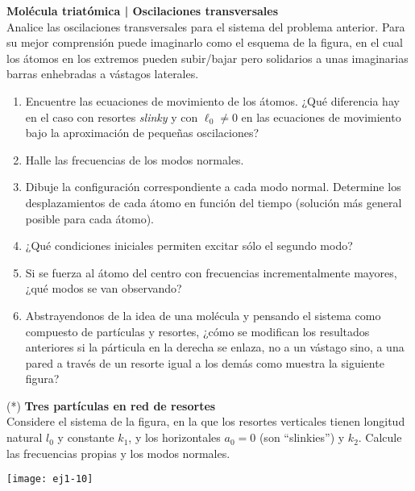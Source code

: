 \item
\textbf{Molécula triatómica | Oscilaciones transversales}\\
Analice las oscilaciones transversales para el sistema del problema anterior.
Para su mejor comprensión puede imaginarlo como el esquema de la figura, en el cual los átomos en los extremos pueden subir/bajar pero solidarios a unas imaginarias barras enhebradas a vástagos laterales. 
\begin{figure}[h]
	\centering
	
\end{figure} 
\begin{enumerate}
	\item Encuentre las ecuaciones de movimiento de los átomos.
	¿Qué diferencia hay en el caso con resortes \emph{slinky} y con $\ell_0 \neq 0$ en las ecuaciones de movimiento bajo la aproximación de pequeñas oscilaciones? 
	\item Halle las frecuencias de los modos normales.
	\item Dibuje la configuración correspondiente a cada modo normal.
	Determine los desplazamientos de cada átomo en función del tiempo (solución más general posible para cada átomo).
	\item ¿Qué condiciones iniciales permiten excitar sólo el segundo modo?
	\item Si se fuerza al átomo del centro con frecuencias incrementalmente mayores, ¿qué modos se van observando?
	\item Abstrayendonos de la idea de una molécula y pensando el sistema como compuesto de partículas y resortes, ¿cómo se modifican los resultados anteriores si la párticula en la derecha se enlaza, no a un vástago sino, a una pared a través de un resorte igual a los demás como muestra la siguiente figura?
	\begin{figure}[h]
		\centering
		
	\end{figure} 
\end{enumerate}



\item 
\begin{minipage}[t][1.2cm]{0.6\textwidth}
(*) \textbf{Tres partículas en red de resortes}\\
Considere el sistema de la figura, en la que los resortes verticales tienen longitud natural $l_0$ y constante $k_1$, y los horizontales $a_0= 0$ (son ``slinkies'') y $k_2$.
Calcule las frecuencias propias y los modos normales. 
\end{minipage}
\begin{minipage}[c][1.2cm][t]{0.35\textwidth}
  \texttt{[image: ej1-10]}
\end{minipage}
